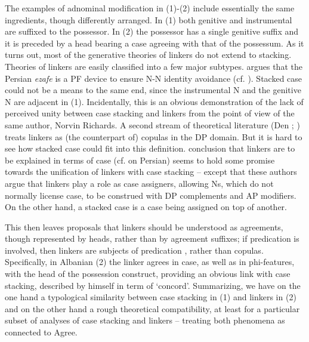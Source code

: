 \documentclass[output=paper]{langsci/langscibook}
\begin{document}
The examples of adnominal modification in (1)-(2) include essentially the same ingredients, though differently arranged. In (1) both genitive and instrumental are suffixed to the possessor. In (2) the possessor has a single genitive suffix and it is preceded by a head bearing a case agreeing with that of the possessum. As it turns out, most of the generative theories of linkers do not extend to stacking. Theories of linkers are easily classified into a few major subtypes. \citet{Richards2010} argues that the Persian \textit{ezafe} is a PF device to ensure N-N identity avoidance (cf. \citealt{Ghomeshi1997}). Stacked case could not be a means to the same end, since the instrumental N and the genitive N are adjacent in (1). Incidentally, this is an obvious demonstration of the lack of perceived unity between case stacking and linkers from the point of view of the same author, Norvin Richards. A second stream of theoretical literature (Den \citealt{Dikken2004}; \citealt{Campos2005}) treats linkers as (the counterpart of) copulas in the DP domain. But it is hard to see how stacked case could fit into this definition.  conclusion that linkers are to be explained in terms of case (cf. \citealt{Samiian1994} on Persian) seems to hold some promise towards the unification of linkers with case stacking – except that these authors argue that linkers play a role as case assigners, allowing Ns, which do not normally license case, to be construed with DP complements and AP modifiers. On the other hand, a stacked case is a case being assigned on top of another. 

This then leaves proposals \citep{Philip2012} that linkers should be understood as agreements, though represented by heads, rather than by agreement suffixes; if predication is involved, then linkers are subjects of predication \citep{Franco2015}, rather than copulas. Specifically, in Albanian (2) the linker agrees in case, as well as in phi-features, with the head of the possession construct, providing an obvious link with case stacking, described by \citet{Richards2013} himself in term of ‘concord’. Summarizing, we have on the one hand a typological similarity between case stacking in (1) and linkers in (2) and on the other hand a rough theoretical compatibility, at least for a particular subset of analyses of case stacking and linkers – treating both phenomena as connected to Agree. 
\end{document}
